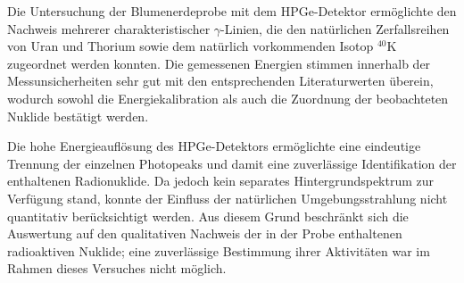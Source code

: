 Die Untersuchung der Blumenerdeprobe mit dem HPGe-Detektor ermöglichte den Nachweis mehrerer charakteristischer $\gamma$-Linien, die den natürlichen Zerfallsreihen von Uran und Thorium sowie dem natürlich vorkommenden Isotop $^{40}$K zugeordnet werden konnten. Die gemessenen Energien stimmen innerhalb der Messunsicherheiten sehr gut mit den entsprechenden Literaturwerten überein, wodurch sowohl die Energiekalibration als auch die Zuordnung der beobachteten Nuklide bestätigt werden.

Die hohe Energieauflösung des HPGe-Detektors ermöglichte eine eindeutige Trennung der einzelnen Photopeaks und damit eine zuverlässige Identifikation der enthaltenen Radionuklide. Da jedoch kein separates Hintergrundspektrum zur Verfügung stand, konnte der Einfluss der natürlichen Umgebungsstrahlung nicht quantitativ berücksichtigt werden. Aus diesem Grund beschränkt sich die Auswertung auf den qualitativen Nachweis der in der Probe enthaltenen radioaktiven Nuklide; eine zuverlässige Bestimmung ihrer Aktivitäten war im Rahmen dieses Versuches nicht möglich.
